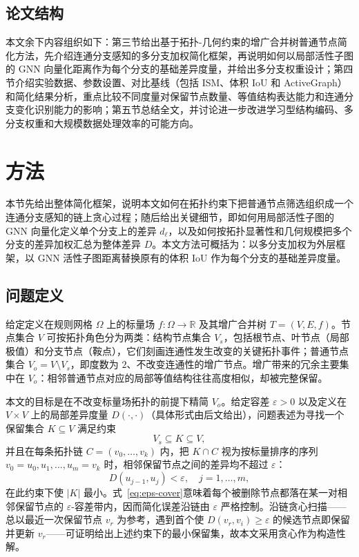 \documentclass[twocolumn, a4paper, 10pt]{article}
\begin{document}
\subsection{论文结构}

本文余下内容组织如下：第三节给出基于拓扑-几何约束的增广合并树普通节点简化方法，先介绍连通分支感知的多分支加权简化框架，再说明如何以局部活性子图的 GNN 向量化距离作为每个分支的基础差异度量，并给出多分支权重设计；第四节介绍实验数据、参数设置、对比基线（包括 ISM、体积 IoU 和 ActiveGraph）和简化结果分析，重点比较不同度量对保留节点数量、等值结构表达能力和连通分支变化识别能力的影响；第五节总结全文，并讨论进一步改进学习型结构编码、多分支权重和大规模数据处理效率的可能方向。

\section{方法}

本节先给出整体简化框架，说明本文如何在拓扑约束下把普通节点筛选组织成一个连通分支感知的链上贪心过程；随后给出关键细节，即如何用局部活性子图的 GNN 向量化定义单个分支上的差异 $d_\ell$，以及如何按拓扑显著性和几何规模把多个分支的差异加权汇总为整体差异 $D$。本文方法可概括为：以多分支加权为外层框架，以 GNN 活性子图距离替换原有的体积 IoU 作为每个分支的基础差异度量。

\subsection{问题定义}

给定定义在规则网格 $\Omega$ 上的标量场 $f:\Omega\rightarrow\mathbb{R}$ 及其增广合并树 $T=(V,E,f)$。节点集合 $V$ 可按拓扑角色分为两类：结构节点集合 $V_s$，包括根节点、叶节点（局部极值）和分支节点（鞍点），它们刻画连通性发生改变的关键拓扑事件；普通节点集合 $V_o=V\setminus V_s$，即度数为 $2$、不改变连通性的增广节点。增广带来的冗余主要集中在 $V_o$：相邻普通节点对应的局部等值结构往往高度相似，却被完整保留。

本文的目标是在不改变标量场拓扑的前提下精简 $V_o$。给定容差 $\varepsilon>0$ 以及定义在 $V\times V$ 上的局部差异度量 $D(\cdot,\cdot)$（具体形式由后文给出），问题表述为寻找一个保留集合 $K\subseteq V$ 满足约束
\begin{equation}
V_s\subseteq K\subseteq V,
\label{eq:keep-constraint}
\end{equation}
并且在每条拓扑链 $C=(v_0,\ldots,v_k)$ 内，把 $K\cap C$ 视为按标量排序的序列 $v_0=u_0,u_1,\ldots,u_m=v_k$ 时，相邻保留节点之间的差异均不超过 $\varepsilon$：
\begin{equation}
D(u_{j-1},u_j)<\varepsilon,\quad j=1,\ldots,m,
\label{eq:eps-cover}
\end{equation}
在此约束下使 $|K|$ 最小。式~\eqref{eq:eps-cover}意味着每个被删除节点都落在某一对相邻保留节点的 $\varepsilon$-容差带内，因而简化误差沿链由 $\varepsilon$ 严格控制。沿链贪心扫描——总以最近一次保留节点 $v_r$ 为参考，遇到首个使 $D(v_r,v_i)\geq\varepsilon$ 的候选节点即保留并更新 $v_r$——可证明给出上述约束下的最小保留集，故本文采用贪心作为构造性解。
\end{document}
